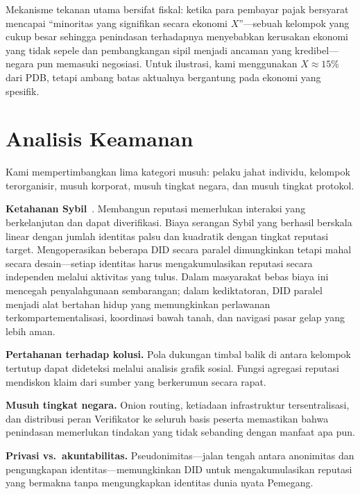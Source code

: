 \documentclass[11pt,a4paper,twocolumn]{article}
\begin{document}
Mekanisme tekanan utama bersifat fiskal: ketika para pembayar pajak bersyarat mencapai ``minoritas yang signifikan secara ekonomi $X$''---sebuah kelompok yang cukup besar sehingga penindasan terhadapnya menyebabkan kerusakan ekonomi yang tidak sepele dan pembangkangan sipil menjadi ancaman yang kredibel---negara pun memasuki negosiasi. Untuk ilustrasi, kami menggunakan $X \approx 15\%$ dari PDB, tetapi ambang batas aktualnya bergantung pada ekonomi yang spesifik.

\section{Analisis Keamanan}

Kami mempertimbangkan lima kategori musuh: pelaku jahat individu, kelompok terorganisir, musuh korporat, musuh tingkat negara, dan musuh tingkat protokol.

\textbf{Ketahanan Sybil}~\cite{douceur2002}. Membangun reputasi memerlukan interaksi yang berkelanjutan dan dapat diverifikasi. Biaya serangan Sybil yang berhasil berskala linear dengan jumlah identitas palsu dan kuadratik dengan tingkat reputasi target. Mengoperasikan beberapa DID secara paralel dimungkinkan tetapi mahal secara desain---setiap identitas harus mengakumulasikan reputasi secara independen melalui aktivitas yang tulus. Dalam masyarakat bebas biaya ini mencegah penyalahgunaan sembarangan; dalam kediktatoran, DID paralel menjadi alat bertahan hidup yang memungkinkan perlawanan terkompartementalisasi, koordinasi bawah tanah, dan navigasi pasar gelap yang lebih aman.

\textbf{Pertahanan terhadap kolusi.} Pola dukungan timbal balik di antara kelompok tertutup dapat dideteksi melalui analisis grafik sosial. Fungsi agregasi reputasi mendiskon klaim dari sumber yang berkerumun secara rapat.

\textbf{Musuh tingkat negara.} Onion routing, ketiadaan infrastruktur tersentralisasi, dan distribusi peran Verifikator ke seluruh basis peserta memastikan bahwa penindasan memerlukan tindakan yang tidak sebanding dengan manfaat apa pun.

\textbf{Privasi vs.\ akuntabilitas.} Pseudonimitas---jalan tengah antara anonimitas dan pengungkapan identitas---memungkinkan DID untuk mengakumulasikan reputasi yang bermakna tanpa mengungkapkan identitas dunia nyata Pemegang.
\end{document}
